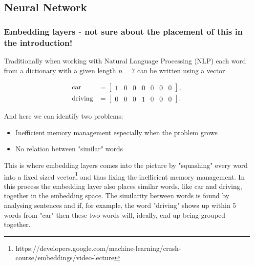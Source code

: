 \subsection{Neural Network}\label{neural_network}
\subsubsection{Embedding layers - not sure about the placement of this in the introduction!}
Traditionally when working with Natural Language Processing (NLP) each word from a dictionary with a given length $n = 7$ can be written using a vector

\begin{equation}
    \begin{split}
        \text{car} &=
        \begin{bmatrix}
            1 & 0 & 0 & 0 & 0 & 0 & 0
        \end{bmatrix}, \\
        \text{driving} &= 
        \begin{bmatrix}
            0 & 0 & 0 & 1 & 0 & 0 & 0
        \end{bmatrix}.
    \end{split}
\end{equation}

And here we can identify two problems:

\begin{itemize}
    \item Inefficient memory management especially when the problem grows
    \item No relation between "similar" words
\end{itemize}

This is where embedding layers comes into the picture by "squashing" every word into a fixed sized vector\footnote{https://developers.google.com/machine-learning/crash-course/embeddings/video-lecture} and thus fixing the inefficient memory management. 
In this process the embedding layer also places similar words, like car and driving, together in the embedding space. The similarity between words is found by analysing sentences and if, for example, the word "driving" shows up within 5 words from "car" then these two words will, ideally, end up being grouped together. 

